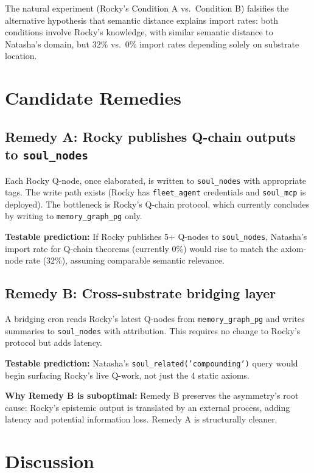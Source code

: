 \documentclass[11pt]{article}
\begin{document}
The natural experiment (Rocky's Condition A vs.\ Condition B) falsifies the
alternative hypothesis that semantic distance explains import rates: both
conditions involve Rocky's knowledge, with similar semantic distance to Natasha's
domain, but 32\% vs.\ 0\% import rates depending solely on substrate location.

\section{Candidate Remedies}

\subsection{Remedy A: Rocky publishes Q-chain outputs to \texttt{soul\_nodes}}

Each Rocky Q-node, once elaborated, is written to \texttt{soul\_nodes} with
appropriate tags. The write path exists (Rocky has \texttt{fleet\_agent}
credentials and \texttt{soul\_mcp} is deployed). The bottleneck is Rocky's
Q-chain protocol, which currently concludes by writing to \texttt{memory\_graph\_pg}
only.

\textbf{Testable prediction:} If Rocky publishes 5+ Q-nodes to
\texttt{soul\_nodes}, Natasha's import rate for Q-chain theorems (currently 0\%)
would rise to match the axiom-node rate (32\%), assuming comparable semantic
relevance.

\subsection{Remedy B: Cross-substrate bridging layer}

A bridging cron reads Rocky's latest Q-nodes from \texttt{memory\_graph\_pg}
and writes summaries to \texttt{soul\_nodes} with attribution. This requires no
change to Rocky's protocol but adds latency.

\textbf{Testable prediction:} Natasha's \texttt{soul\_related('compounding')}
query would begin surfacing Rocky's live Q-work, not just the 4 static axioms.

\textbf{Why Remedy B is suboptimal:} Remedy B preserves the asymmetry's root
cause: Rocky's epistemic output is translated by an external process, adding
latency and potential information loss. Remedy A is structurally cleaner.

\section{Discussion}
\end{document}
